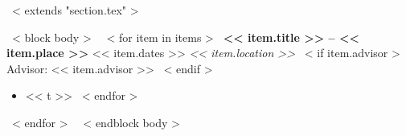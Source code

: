 ~< extends "section.tex" >~

~< block body >~
    ~< for item in items >~
          \textbf{<< item.title >> -- << item.place >>} \hfill << item.dates >> \newline
          \small{\emph{<< item.location >>}}
          ~< if item.advisor >~
          \newline
          Advisor: << item.advisor >>
          ~< endif >~
          \begin{itemize}
          ~< for t in item.area >~
            \item << t >>
          ~< endfor >~
          \end{itemize}
    ~< endfor >~
~< endblock body >~
